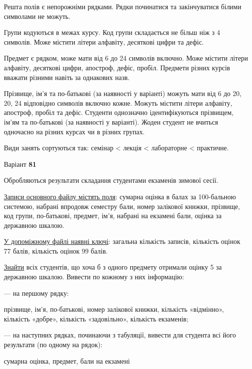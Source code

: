 \documentclass[11pt, ukrainian]{article}
\begin{document}
Решта полів є непорожніми рядками.
Рядки починатися та закінчуватися білими символами не можуть.

Групи кодуються в межах курсу.
Код групи складається не більш ніж з 4 символів.
Може містити літери алфавіту, десяткові цифри та дефіс.

Предмет є рядком, може мати від 6 до 24 символів включно.
Може містити літери алфавіту, десяткові цифри, апостроф, дефіс, пробіл.
Предмети різних курсів вважати різними навіть за однакових назв.

Прізвище, ім’я та по-батькові (за наявності у варіанті)
можуть мати від 6 до 20, 20, 24 відповідно символів включно кожне.
Можуть містити літери алфавіту, апостроф, пробіл та дефіс.
Студенти однозначно ідентифікуються прізвищем, ім’ям та по-батькові (за наявності у варіанті).
Жоден студент не вчиться одночасно на різних курсах чи в різних групах.

Види занять сортуються так: семінар < лекція < лабораторне < практичне.





\par
\newpage
{\center Варіант  \No \textbf { 81 }\par}
\bigskip
Обробляються результати складання студентами екзаменів зимової сесії.

\underline{Записи основного файлу містять поля}: сумарна оцінка в балах за 100-бальною системою, набрані впродовж семестру бали, номер залікової книжки, прізвище, код групи, по-батькові, предмет, ім’я, набрані на екзамені бали, оцінка за державною шкалою.

\underline{У допоміжному файлі наявні ключі}: загальна кількість записів, кількість оцінок 77 балів, кількість оцінок 99 балів.

\underline{Знайти} всіх студентів, що хоча б з одного предмету отримали оцінку 5 за державною шкалою. Вивести по кожному з них інформацію:\par
{\noindent}--- на першому рядку:\par
прізвище, ім’я, по-батькові, номер залікової книжки, кількість «відмінно», кількість «добре», кількість «задовільно», кількість екзаменів;

{\noindent}--- на наступних рядках, починаючи з табуляції, вивести для студента всі його результати (по одному на рядок):\par
сумарна оцінка, предмет, бали на екзамені
\end{document}
